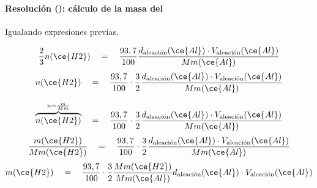 \begin{frame}
    \frametitle{\ejerciciocmd}
    \framesubtitle{Resolución (): cálculo de la masa del }
     Igualando expresiones previas.
    \begin{overprint}
            $$
                \frac{2}{3}n(\ce{H2})
                \quad =\quad
                \frac{93,7}{100}
                \frac{d_{\text{aleación}}(\ce{Al})\cdot V_{\text{aleación}}(\ce{Al})}{Mm(\ce{Al})}
            $$
            $$
                n(\ce{H2})
                \quad =\quad
                \frac{93,7}{100}\cdot
                \frac{3}{2}
                \frac{d_{\text{aleación}}(\ce{Al})\cdot V_{\text{aleación}}(\ce{Al})}{Mm(\ce{Al})}
            $$
    \end{overprint}
        \begin{overprint}
                $$
                    \overbrace{n(\ce{H2})}^{n=\frac{m}{Mm}}
                    \quad =\quad
                    \frac{93,7}{100}\cdot
                    \frac{3}{2}
                    \frac{d_{\text{aleación}}(\ce{Al})\cdot V_{\text{aleación}}(\ce{Al})}{Mm(\ce{Al})}
                $$
                $$
                    \frac{m(\ce{H2})}{Mm(\ce{H2})}
                    \quad =\quad
                    \frac{93,7}{100}\cdot
                    \frac{3}{2}
                    \frac{d_{\text{aleación}}(\ce{Al})\cdot V_{\text{aleación}}(\ce{Al})}{Mm(\ce{Al})}
                $$
                $$
                    m(\ce{H2})
                    \quad =\quad
                    \frac{93,7}{100}\cdot
                    \frac{3}{2}
                    \frac{Mm(\ce{H2})}{Mm(\ce{Al})}
                    d_{\text{aleación}}(\ce{Al})\cdot V_{\text{aleación}}(\ce{Al})
                $$
        \end{overprint}
\end{frame}
